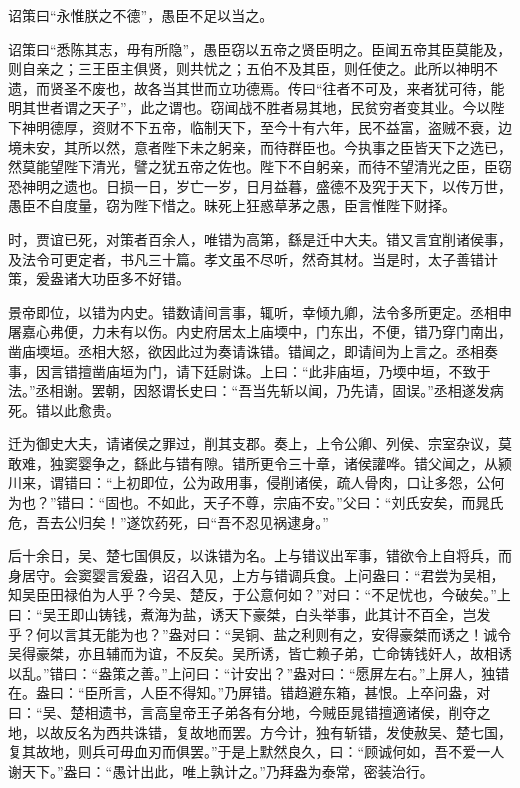 \documentclass[]{article}
\begin{document}
诏策曰``永惟朕之不德''，愚臣不足以当之。

诏策曰``悉陈其志，毋有所隐''，愚臣窃以五帝之贤臣明之。臣闻五帝其臣莫能及，则自亲之；三王臣主俱贤，则共忧之；五伯不及其臣，则任使之。此所以神明不遗，而贤圣不废也，故各当其世而立功德焉。传曰``往者不可及，来者犹可待，能明其世者谓之天子''，此之谓也。窃闻战不胜者易其地，民贫穷者变其业。今以陛下神明德厚，资财不下五帝，临制天下，至今十有六年，民不益富，盗贼不衰，边境未安，其所以然，意者陛下未之躬亲，而待群臣也。今执事之臣皆天下之选已，然莫能望陛下清光，譬之犹五帝之佐也。陛下不自躬亲，而待不望清光之臣，臣窃恐神明之遗也。日损一日，岁亡一岁，日月益暮，盛德不及究于天下，以传万世，愚臣不自度量，窃为陛下惜之。昧死上狂惑草茅之愚，臣言惟陛下财择。

时，贾谊已死，对策者百余人，唯错为高第，繇是迁中大夫。错又言宜削诸侯事，及法令可更定者，书凡三十篇。孝文虽不尽听，然奇其材。当是时，太子善错计策，爰盎诸大功臣多不好错。

景帝即位，以错为内史。错数请间言事，辄听，幸倾九卿，法令多所更定。丞相申屠嘉心弗便，力未有以伤。内史府居太上庙堧中，门东出，不便，错乃穿门南出，凿庙堧垣。丞相大怒，欲因此过为奏请诛错。错闻之，即请间为上言之。丞相奏事，因言错擅凿庙垣为门，请下廷尉诛。上曰：``此非庙垣，乃堧中垣，不致于法。''丞相谢。罢朝，因怒谓长史曰：``吾当先斩以闻，乃先请，固误。''丞相遂发病死。错以此愈贵。

迁为御史大夫，请诸侯之罪过，削其支郡。奏上，上令公卿、列侯、宗室杂议，莫敢难，独窦婴争之，繇此与错有隙。错所更令三十章，诸侯讙哗。错父闻之，从颍川来，谓错曰：``上初即位，公为政用事，侵削诸侯，疏人骨肉，口让多怨，公何为也？''错曰：``固也。不如此，天子不尊，宗庙不安。''父曰：``刘氏安矣，而晁氏危，吾去公归矣！''遂饮药死，曰``吾不忍见祸逮身。''

后十余日，吴、楚七国俱反，以诛错为名。上与错议出军事，错欲令上自将兵，而身居守。会窦婴言爰盎，诏召入见，上方与错调兵食。上问盎曰：``君尝为吴相，知吴臣田禄伯为人乎？今吴、楚反，于公意何如？''对曰：``不足忧也，今破矣。''上曰：``吴王即山铸钱，煮海为盐，诱天下豪桀，白头举事，此其计不百全，岂发乎？何以言其无能为也？''盎对曰：``吴铜、盐之利则有之，安得豪桀而诱之！诚令吴得豪桀，亦且辅而为谊，不反矣。吴所诱，皆亡赖子弟，亡命铸钱奸人，故相诱以乱。''错曰：``盎策之善。''上问曰：``计安出？''盎对曰：``愿屏左右。''上屏人，独错在。盎曰：``臣所言，人臣不得知。''乃屏错。错趋避东箱，甚恨。上卒问盎，对曰：``吴、楚相遗书，言高皇帝王子弟各有分地，今贼臣晁错擅適诸侯，削夺之地，以故反名为西共诛错，复故地而罢。方今计，独有斩错，发使赦吴、楚七国，复其故地，则兵可毋血刃而俱罢。''于是上默然良久，曰：``顾诚何如，吾不爱一人谢天下。''盎曰：``愚计出此，唯上孰计之。''乃拜盎为泰常，密装治行。
\end{document}
